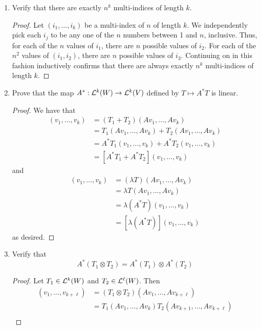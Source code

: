 \documentclass[../psets.tex]{subfiles}
\begin{document}
\begin{enumerate}[label={\textbf{1.3.\roman*.}}]
    \item Verify that there are exactly $n^k$ multi-indices of length $k$.
    \begin{proof}
        Let $(i_1,\dots,i_k)$ be a multi-index of $n$ of length $k$. We independently pick each $i_j$ to be any one of the $n$ numbers between 1 and $n$, inclusive. Thus, for each of the $n$ values of $i_1$, there are $n$ possible values of $i_2$. For each of the $n^2$ values of $(i_1,i_2)$, there are $n$ possible values of $i_3$. Continuing on in this fashion inductively confirms that there are always exactly $n^k$ multi-indices of length $k$.
    \end{proof}
    \item Prove that the map $A^*:\lin[k]{W}\to\lin[k]{V}$ defined by $T\mapsto A^*T$ is linear.
    \begin{proof}
        We have that
        \begin{align*}
            [A^*(T_1+T_2)](v_1,\dots,v_k) &= (T_1+T_2)(Av_1,\dots,Av_k)\\
            &= T_1(Av_1,\dots,Av_k)+T_2(Av_1,\dots,Av_k)\\
            &= A^*T_1(v_1,\dots,v_k)+A^*T_2(v_1,\dots,v_k)\\
            &= [A^*T_1+A^*T_2](v_1,\dots,v_k)
        \end{align*}
        and
        \begin{align*}
            [A^*(\lambda T)](v_1,\dots,v_k) &= (\lambda T)(Av_1,\dots,Av_k)\\
            &= \lambda T(Av_1,\dots,Av_k)\\
            &= \lambda(A^*T)(v_1,\dots,v_k)\\
            &= [\lambda(A^*T)](v_1,\dots,v_k)
        \end{align*}
        as desired.
    \end{proof}
    \item Verify that
    \begin{equation*}
        A^*(T_1\otimes T_2) = A^*(T_1)\otimes A^*(T_2)
    \end{equation*}
    \begin{proof}
        Let $T_1\in\lin[k]{W}$ and $T_2\in\lin[\ell]{W}$. Then
        \begin{align*}
            [A^*(T_1\otimes T_2)](v_1,\dots,v_{k+\ell}) &= (T_1\otimes T_2)(Av_1,\dots,Av_{k+\ell})\\
            &= T_1(Av_1,\dots,Av_k)T_2(Av_{k+1},\dots,Av_{k+\ell})\\

\end{align*}
\end{proof}
\end{enumerate}
\end{document}
